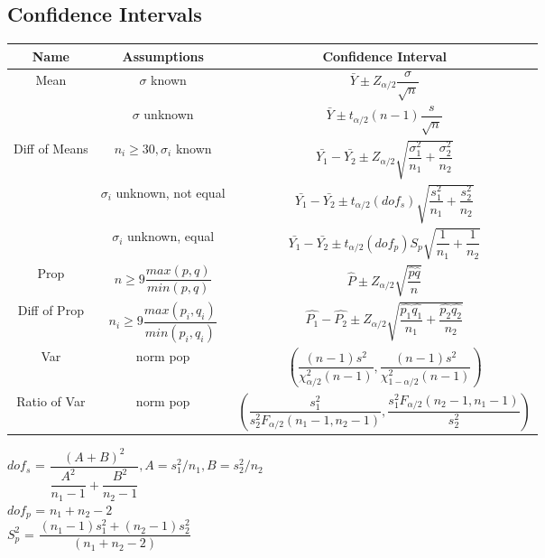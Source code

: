 \documentclass{article}
\begin{document}
\begin{multicols}{2}
\section{Confidence Intervals}
\begin{tabular}{| c | c | c |}
\hline
Name & Assumptions & Confidence Interval \\ \hline
Mean & $\sigma$ known & $\bar{Y} \pm Z_{\alpha/2}\dfrac{\sigma}{\sqrt{n}}$ \\ \hline

& $\sigma$ unknown & $\bar{Y} \pm t_{\alpha/2}(n-1)\dfrac{s}{\sqrt{n}}$ \\ \hline

Diff of Means & $n_i\geq30, \sigma_i$ known & $\bar{Y_1} - \bar{Y_2} \pm Z_{\alpha/2}\sqrt{\dfrac{\sigma_1^2}{n_1}+\dfrac{\sigma_2^2}{n_2}}$ \\ \hline

& $\sigma_i$ unknown, not equal & $\bar{Y_1} - \bar{Y_2} \pm t_{\alpha/2}(dof_s)\sqrt{\dfrac{s_1^2}{n_1}+\dfrac{s_2^2}{n_2}}$\\ \hline

& $\sigma_i$ unknown, equal & $\bar{Y_1} - \bar{Y_2} \pm t_{\alpha/2}(dof_p)S_p\sqrt{\dfrac{1}{n_1}+\dfrac{1}{n_2}}$\\ \hline

Prop & $n\geq9\dfrac{max(p,q)}{min(p,q)}$ & $\hat{P} \pm Z_{\alpha/2}\sqrt{\dfrac{\hat{p}\hat{q}}{n}}$ \\ \hline

Diff of Prop & $n_i\geq9\dfrac{max(p_i,q_i)}{min(p_i,q_i)}$ & $\hat{P_1} - \hat{P_2} \pm Z_{\alpha/2}\sqrt{\dfrac{\hat{p_1}\hat{q_1}}{n_1}+\dfrac{\hat{p_2}\hat{q_2}}{n_2}}$ \\ \hline

Var & norm pop & $(\dfrac{(n-1)s^2}{\chi_{\alpha/2}^2(n-1)}, \dfrac{(n-1)s^2}{\chi_{1-\alpha/2}^2(n-1)})$ \\ \hline

Ratio of Var & norm pop & $(\dfrac{s_1^2}{s_2^2F_{\alpha/2}(n_1-1, n_2-1)}, \dfrac{s_1^2F_{\alpha/2}(n_2-1, n_1-1)}{s_2^2})$ \\ \hline
\end{tabular}
\textbf{$dof_s$} = $\dfrac{(A + B)^2}{\dfrac{A^2}{n_1-1} + \dfrac{B^2}{n_2-1}}, A = s_1^2/n_1, B = s_2^2/n_2$ \\
\textbf{$dof_p$} = $n_1 + n_2 - 2$ \\
\textbf{$S_p^2$} = $\dfrac{(n_1-1)s_1^2+(n_2-1)s_2^2}{(n_1+n_2-2)}$\\


\end{multicols}
\end{document}
